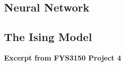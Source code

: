 \subsection{Neural Network}\label{sec:dnn theory}



\subsection{The Ising Model}\label{sec:ising theory}


\textbf{Excerpt from FYS3150 Project 4}

